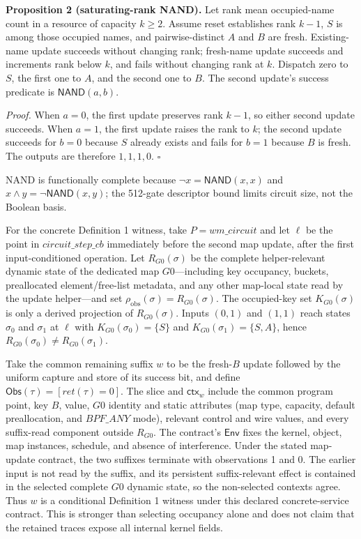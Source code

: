 \documentclass[conference]{IEEEtran}
\begin{document}
\medskip
\noindent\textbf{Proposition 2 (saturating-rank NAND).}
Let rank mean occupied-name count in a resource of capacity $k\ge2$. Assume reset establishes rank $k-1$, $S$ is among those occupied names, and pairwise-distinct $A$ and $B$ are fresh. Existing-name update succeeds without changing rank; fresh-name update succeeds and increments rank below $k$, and fails without changing rank at $k$. Dispatch zero to $S$, the first one to $A$, and the second one to $B$. The second update's success predicate is $\mathsf{NAND}(a,b)$.

\emph{Proof.} When $a=0$, the first update preserves rank $k-1$, so either second update succeeds. When $a=1$, the first update raises the rank to $k$; the second update succeeds for $b=0$ because $S$ already exists and fails for $b=1$ because $B$ is fresh. The outputs are therefore $1,1,1,0$. \hfill$\square$

NAND is functionally complete because $\neg x=\mathsf{NAND}(x,x)$ and $x\land y=\neg\mathsf{NAND}(x,y)$; the 512-gate descriptor bound limits circuit size, not the Boolean basis.

For the concrete Definition 1 witness, take $P=\mathit{wm\_circuit}$ and let $\ell$ be the point in $\mathit{circuit\_step\_cb}$ immediately before the second map update, after the first input-conditioned operation. Let $R_{G0}(\sigma)$ be the complete helper-relevant dynamic state of the dedicated map $G0$---including key occupancy, buckets, preallocated element/free-list metadata, and any other map-local state read by the update helper---and set $\rho_{\mathrm{obs}}(\sigma)=R_{G0}(\sigma)$. The occupied-key set $K_{G0}(\sigma)$ is only a derived projection of $R_{G0}(\sigma)$. Inputs $(0,1)$ and $(1,1)$ reach states $\sigma_0$ and $\sigma_1$ at $\ell$ with $K_{G0}(\sigma_0)=\{S\}$ and $K_{G0}(\sigma_1)=\{S,A\}$, hence $R_{G0}(\sigma_0)\ne R_{G0}(\sigma_1)$.

Take the common remaining suffix $w$ to be the fresh-$B$ update followed by the uniform capture and store of its success bit, and define $\mathsf{Obs}(\tau)=[\mathit{ret}(\tau)=0]$. The slice and $\mathsf{ctx}_w$ include the common program point, key $B$, value, $G0$ identity and static attributes (map type, capacity, default preallocation, and $\mathit{BPF\_ANY}$ mode), relevant control and wire values, and every suffix-read component outside $R_{G0}$. The contract's $\mathsf{Env}$ fixes the kernel, object, map instances, schedule, and absence of interference. Under the stated map-update contract, the two suffixes terminate with observations 1 and 0. The earlier input is not read by the suffix, and its persistent suffix-relevant effect is contained in the selected complete $G0$ dynamic state, so the non-selected contexts agree. Thus $w$ is a conditional Definition 1 witness under this declared concrete-service contract. This is stronger than selecting occupancy alone and does not claim that the retained traces expose all internal kernel fields.
\end{document}
